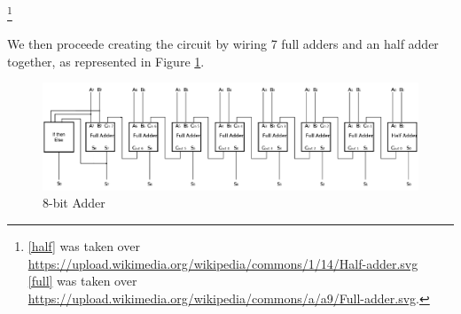 \documentclass[12pt]{article}
\begin{document}
\footnote{\ref{half} was taken over \url{https://upload.wikimedia.org/wikipedia/commons/1/14/Half-adder.svg}\\ 
\ref{full} was taken over \url{https://upload.wikimedia.org/wikipedia/commons/a/a9/Full-adder.svg}.}

We then proceede creating the circuit by wiring 7 full adders and an half adder together, as represented in Figure \ref{circuit}.

\begin{figure}[!h]
    \centering
    \includegraphics[width=0.95\linewidth]{../src/images/Circuit.png}
    \caption{8-bit Adder}\label{circuit}
\end{figure}
\vfill
\end{document}
